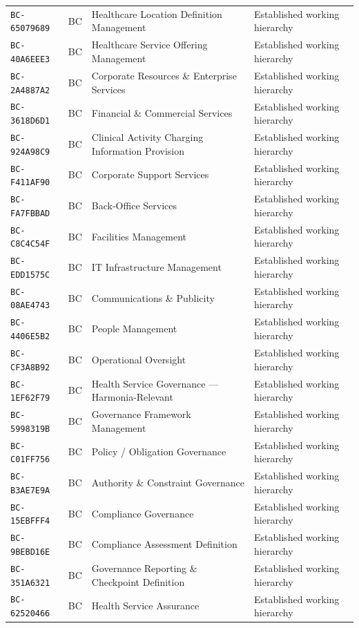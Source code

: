 \documentclass[11pt,a4paper,openany]{book}
\begin{document}
\begin{longtable}{@{}p{.19\linewidth}p{.12\linewidth}p{.39\linewidth}p{.24\linewidth}@{}}
\texttt{BC-65079689} & BC & Healthcare Location Definition Management & Established working hierarchy \\
\texttt{BC-40A6EEE3} & BC & Healthcare Service Offering Management & Established working hierarchy \\
\texttt{BC-2A4887A2} & BC & Corporate Resources \& Enterprise Services & Established working hierarchy \\
\texttt{BC-3618D6D1} & BC & Financial \& Commercial Services & Established working hierarchy \\
\texttt{BC-924A98C9} & BC & Clinical Activity Charging Information Provision & Established working hierarchy \\
\texttt{BC-F411AF90} & BC & Corporate Support Services & Established working hierarchy \\
\texttt{BC-FA7FBBAD} & BC & Back-Office Services & Established working hierarchy \\
\texttt{BC-C8C4C54F} & BC & Facilities Management & Established working hierarchy \\
\texttt{BC-EDD1575C} & BC & IT Infrastructure Management & Established working hierarchy \\
\texttt{BC-08AE4743} & BC & Communications \& Publicity & Established working hierarchy \\
\texttt{BC-4406E5B2} & BC & People Management & Established working hierarchy \\
\texttt{BC-CF3A8B92} & BC & Operational Oversight & Established working hierarchy \\
\texttt{BC-1EF62F79} & BC & Health Service Governance — Harmonia-Relevant & Established working hierarchy \\
\texttt{BC-5998319B} & BC & Governance Framework Management & Established working hierarchy \\
\texttt{BC-C01FF756} & BC & Policy / Obligation Governance & Established working hierarchy \\
\texttt{BC-B3AE7E9A} & BC & Authority \& Constraint Governance & Established working hierarchy \\
\texttt{BC-15EBFFF4} & BC & Compliance Governance & Established working hierarchy \\
\texttt{BC-9BEBD16E} & BC & Compliance Assessment Definition & Established working hierarchy \\
\texttt{BC-351A6321} & BC & Governance Reporting \& Checkpoint Definition & Established working hierarchy \\
\texttt{BC-62520466} & BC & Health Service Assurance & Established working hierarchy \\

\end{longtable}
\end{document}
